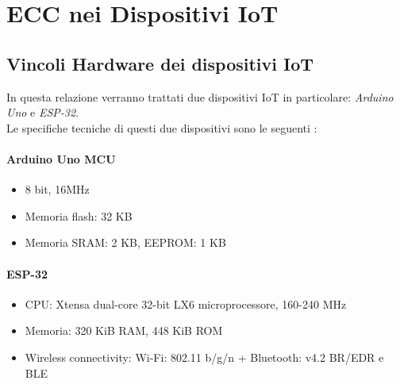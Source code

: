 \documentclass[12pt, a4paper]{report}
\begin{document}
\chapter{ECC nei Dispositivi IoT}
\section{Vincoli Hardware dei dispositivi IoT}
In questa relazione verranno trattati due dispositivi IoT in particolare: \textit{Arduino Uno} e \textit{ESP-32}.
\\Le specifiche tecniche di questi due dispositivi sono le seguenti \cite{Ricci}:
\subsubsection*{Arduino Uno MCU}
\begin{itemize}
    \item  8 bit, 16MHz
    \item Memoria flash: 32 KB
    \item Memoria SRAM: 2 KB, EEPROM: 1 KB
\end{itemize}
\subsubsection*{ESP-32}
\begin{itemize}
    \item CPU: Xtensa dual-core 32-bit LX6 microprocessore, 160-240 MHz
    \item Memoria: 320 KiB RAM, 448 KiB ROM
    \item Wireless connectivity: Wi-Fi: 802.11 b/g/n + Bluetooth: v4.2 BR/EDR e BLE
\end{itemize}
\end{document}
